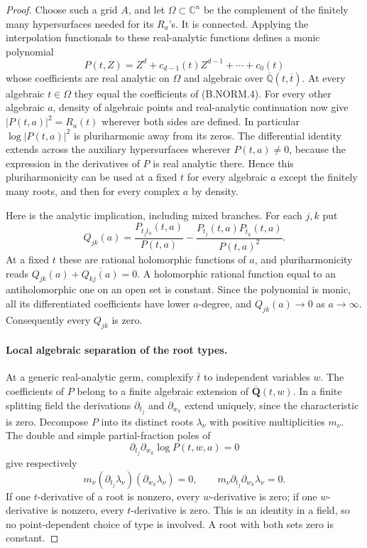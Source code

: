 \begin{proof}
Choose such a grid $A$, and let $\Omega\subset\mathbb C^n$ be
the complement of the finitely many hypersurfaces needed for its
$R_a$'s.  It is connected.  Applying the interpolation functionals
to these real-analytic functions defines a monic polynomial
\[
 P(t,Z)=Z^d+c_{d-1}(t)Z^{d-1}+\cdots+c_0(t)              \tag{B.NORM.6}
\]
whose coefficients are real analytic on $\Omega$ and algebraic
over $\overline{\mathbb Q}(t,\overline t)$.  At every algebraic
$t\in\Omega$ they equal the coefficients of (B.NORM.4).
For every other algebraic $a$, density of algebraic points and
real-analytic continuation now give
$|P(t,a)|^2=R_a(t)$ wherever both sides are defined.
In particular $\log|P(t,a)|^2$ is pluriharmonic away from its
zeros.  The differential identity extends across the auxiliary
hypersurfaces wherever $P(t,a)\ne0$, because the expression in
the derivatives of $P$ is real analytic there.  Hence this
pluriharmonicity can be used at a fixed $t$ for every algebraic
$a$ except the finitely many roots, and then for every complex
$a$ by density.

Here is the analytic implication, including mixed branches.  For
each $j,k$ put
\[
 Q_{jk}(a)=\frac{P_{t_j\overline t_k}(t,a)}{P(t,a)}
          -\frac{P_{t_j}(t,a)P_{\overline t_k}(t,a)}{P(t,a)^2}.
\]
At a fixed $t$ these are rational holomorphic functions of $a$,
and pluriharmonicity reads
$Q_{jk}(a)+\overline{Q_{kj}(a)}=0$.  A holomorphic rational
function equal to an antiholomorphic one on an open set is
constant.  Since the polynomial is monic, all its differentiated
coefficients have lower $a$-degree, and $Q_{jk}(a)\to0$ as
$a\to\infty$.  Consequently every $Q_{jk}$ is zero.

\paragraph{Local algebraic separation of the root types.}
At a generic real-analytic germ, complexify $\bar t$ to independent
variables $w$. The coefficients of $P$ belong to a finite algebraic
extension of $\overline{\mathbf Q}(t,w)$. In a finite splitting
field the derivations $\partial_{t_j}$ and $\partial_{w_k}$ extend
uniquely, since the characteristic is zero. Decompose $P$ into its
distinct roots $\lambda_\nu$ with positive multiplicities $m_\nu$.
The double and simple partial-fraction poles of
\[
 \partial_{t_j}\partial_{w_k}\log P(t,w,a)=0
\]
give respectively
\[
 m_\nu(\partial_{t_j}\lambda_\nu)
        (\partial_{w_k}\lambda_\nu)=0,
 \qquad
 m_\nu\partial_{t_j}\partial_{w_k}\lambda_\nu=0.
\]
If one $t$-derivative of a root is nonzero, every $w$-derivative
is zero; if one $w$-derivative is nonzero, every $t$-derivative
is zero. This is an identity in a field, so no point-dependent
choice of type is involved. A root with both sets zero is constant.


\end{proof}
